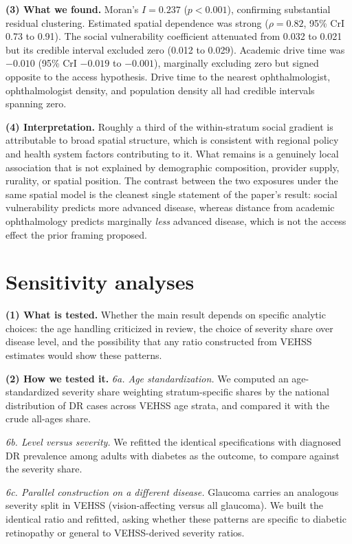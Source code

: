 \documentclass[11pt]{article}
\newcommand{\tpart}[1]{\medskip\noindent\textbf{#1}\quad}
\begin{document}
\tpart{(3) What we found.}
Moran's $I = 0.237$ ($p < 0.001$), confirming substantial residual clustering.
Estimated spatial dependence was strong ($\rho = 0.82$, 95\% CrI 0.73 to 0.91).
The social vulnerability coefficient attenuated from 0.032 to 0.021 but its
credible interval excluded zero (0.012 to 0.029). Academic drive time was
$-0.010$ (95\% CrI $-0.019$ to $-0.001$), marginally excluding zero but signed
opposite to the access hypothesis. Drive time to the nearest ophthalmologist,
ophthalmologist density, and population density all had credible intervals
spanning zero.

\tpart{(4) Interpretation.}
Roughly a third of the within-stratum social gradient is attributable to broad
spatial structure, which is consistent with regional policy and health system
factors contributing to it. What remains is a genuinely local association that
is not explained by demographic composition, provider supply, rurality, or
spatial position. The contrast between the two exposures under the same spatial
model is the cleanest single statement of the paper's result: social
vulnerability predicts more advanced disease, whereas distance from academic
ophthalmology predicts marginally \emph{less} advanced disease, which is not the
access effect the prior framing proposed.

\section{Sensitivity analyses}

\tpart{(1) What is tested.}
Whether the main result depends on specific analytic choices: the age handling
criticized in review, the choice of severity share over disease level, and the
possibility that any ratio constructed from VEHSS estimates would show these
patterns.

\tpart{(2) How we tested it.}
\emph{6a. Age standardization.} We computed an age-standardized severity share
weighting stratum-specific shares by the national distribution of DR cases
across VEHSS age strata, and compared it with the crude all-ages share.

\emph{6b. Level versus severity.} We refitted the identical specifications with
diagnosed DR prevalence among adults with diabetes as the outcome, to compare
against the severity share.

\emph{6c. Parallel construction on a different disease.} Glaucoma carries an
analogous severity split in VEHSS (vision-affecting versus all glaucoma). We
built the identical ratio and refitted, asking whether these patterns are
specific to diabetic retinopathy or general to VEHSS-derived severity ratios.
\end{document}
